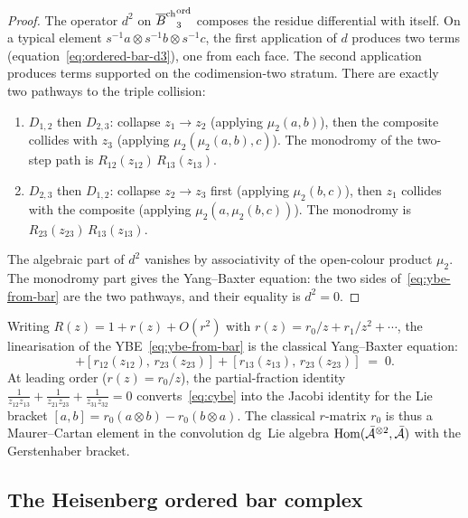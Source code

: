 \begin{proof}
The operator $d^2$ on ${\overline{B}^{\mathrm{ch}}}_3^{\mathrm{ord}}$ composes
the residue differential with itself. On a typical element
$s^{-1}a\otimes s^{-1}b\otimes s^{-1}c$, the first
application of $d$ produces two terms
(equation~\eqref{eq:ordered-bar-d3}), one from each face.
The second application produces terms supported on the
codimension-two stratum. There are exactly two pathways
to the triple collision:
\begin{enumerate}[label=(\roman*)]
\item $D_{1,2}$ then $D_{2,3}$: collapse $z_1\to z_2$
 (applying \(\mu_2(a,b)\)), then the composite collides
 with $z_3$ (applying \(\mu_2(\mu_2(a,b),c)\)).
 The monodromy of the two-step path is
 $R_{12}(z_{12})\,R_{13}(z_{13})$.
\item $D_{2,3}$ then $D_{1,2}$: collapse $z_2\to z_3$
 first (applying \(\mu_2(b,c)\)), then $z_1$ collides with
 the composite (applying \(\mu_2(a,\mu_2(b,c))\)).
 The monodromy is
 $R_{23}(z_{23})\,R_{13}(z_{13})$.
\end{enumerate}
The algebraic part of $d^2$ vanishes by associativity of
the open-colour product \(\mu_2\). The monodromy part
gives the Yang--Baxter equation: the two sides
of~\eqref{eq:ybe-from-bar} are the two pathways, and their
equality is $d^2=0$.
\end{proof}

\begin{corollary}
Writing $R(z)=1+r(z)+O(r^2)$ with
$r(z)=r_0/z+r_1/z^2+\cdots$, the linearisation of
the YBE~\eqref{eq:ybe-from-bar} is the classical
Yang--Baxter equation:
\begin{equation}%
[r_{12}(z_{12}),\,r_{13}(z_{13})]
+[r_{12}(z_{12}),\,r_{23}(z_{23})]
+[r_{13}(z_{13}),\,r_{23}(z_{23})]
\;=\;0.
\end{equation}
At leading order ($r(z)=r_0/z$), the partial-fraction
identity
$\tfrac{1}{z_{12}z_{13}}+\tfrac{1}{z_{21}z_{23}}
+\tfrac{1}{z_{31}z_{32}}=0$
converts~\eqref{eq:cybe} into the Jacobi identity for the
Lie bracket $[a,b]=r_0(a\otimes b)-r_0(b\otimes a)$. The
classical $r$-matrix $r_0$ is thus a Maurer--Cartan element
in the convolution dg~Lie algebra
$\operatorname{Hom}(\bar{\mathcal{A}}^{\otimes 2},\bar{\mathcal{A}})$ with the
Gerstenhaber bracket.
\end{corollary}

\subsection{The Heisenberg ordered bar complex}

